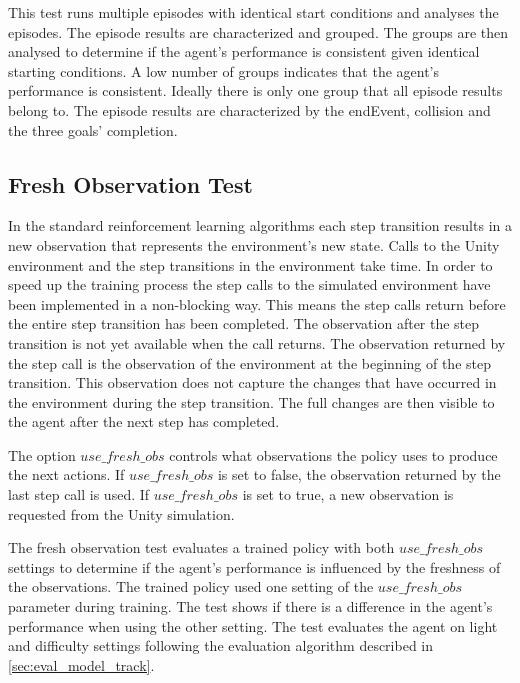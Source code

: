 This test runs multiple episodes with identical start conditions and analyses the episodes. The episode results are characterized and grouped. The groups are then analysed to determine if the agent's performance is consistent given identical starting conditions. A low number of groups indicates that the agent's performance is consistent. Ideally there is only one group that all episode results belong to.
The episode results are characterized by the endEvent, collision and the three goals' completion.



\subsection{Fresh Observation Test}

In the standard reinforcement learning algorithms each step transition results in a new observation that represents the environment's new state. Calls to the Unity environment and the step transitions in the environment take time. In order to speed up the training process the step calls to the simulated environment have been implemented in a non-blocking way. This means the step calls return before the entire step transition has been completed. The observation after the step transition is not yet available when the call returns. The observation returned by the step call is the observation of the environment at the beginning of the step transition. This observation does not capture the changes that have occurred in the environment during the step transition. The full changes are then visible to the agent after the next step has completed.

The option $use\_fresh\_obs$ controls what observations the policy uses to produce the next actions. If $use\_fresh\_obs$ is set to false, the observation returned by the last step call is used. If $use\_fresh\_obs$ is set to true, a new observation is requested from the Unity simulation.

The fresh observation test evaluates a trained policy with both $use\_fresh\_obs$ settings to determine if the agent's performance is influenced by the freshness of the observations. The trained policy used one setting of the $use\_fresh\_obs$ parameter during training. The test shows if there is a difference in the agent's performance when using the other setting. The test evaluates the agent on light and difficulty settings following the evaluation algorithm described in \ref{sec:eval_model_track}.



